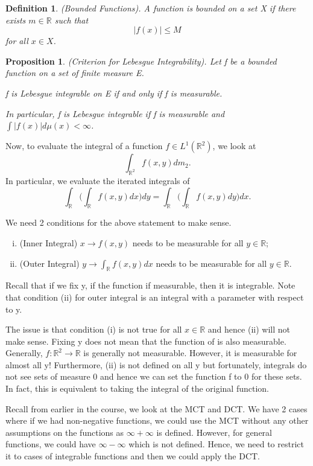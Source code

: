 \documentclass[twoside]{article}
\newtheorem{proposition}[theorem]{Proposition}
\newtheorem{definition}[theorem]{Definition}
\begin{document}
\begin{definition}(Bounded Functions). A function is bounded on a set X if there exists $m \in \mathbb{R}$ such that
$$
|f(x)| \leq M
$$
for all $x \in X$.
\end{definition}


\begin{proposition}(Criterion for Lebesgue Integrability). Let f be a bounded function on a set of finite measure E. 
\begin{center}
  f is Lebesgue integrable on E if and only if f is measurable.
\end{center}

In particular, f is Lebesgue integrable if f is measurable and $\int|f(x)|d\mu(x) < \infty$.
\end{proposition}

\bigskip
Now, to evaluate the integral of a function $f \in L^1(\mathbb{R}^2)$, we look at
$$
\int_{\mathbb{R}^2}f(x,y)dm_2.
$$
In particular, we evaluate the iterated integrals of 
$$
\int_{\mathbb{R}}\big(\int_{\mathbb{R}}f(x,y)dx\big)dy = \int_{\mathbb{R}}\big(\int_{\mathbb{R}}f(x,y)dy\big)dx.
$$

We need 2 conditions for the above statement to make sense. 

\begin{enumerate}[(i)]
  \item (Inner Integral) $x \rightarrow f(x,y)$ needs to be measurable for all $y \in \mathbb{R}$;
  \item (Outer Integral) $y \rightarrow \int_{\mathbb{R}}f(x,y)dx$ needs to be measurable for all $y \in \mathbb{R}$.
\end{enumerate}

Recall that if we fix y, if the function if measurable, then it is integrable. Note that condition (ii) for outer integral is an integral with a parameter with respect to y.

The issue is that condition (i) is not true for all $x \in \mathbb{R}$ and hence (ii) will not make sense. Fixing y does not mean that the function of is also measurable. Generally, $f: \mathbb{R}^2 \rightarrow \mathbb{R}$ is generally not measurable. However, it is measurable for almost all y! Furthermore, (ii) is not defined on all y but fortunately, integrals do not see sets of measure 0 and hence we can set the function f to 0 for these sets. In fact, this is equivalent to taking the integral of the original function.

Recall from earlier in the course, we look at the MCT and DCT. We have 2 cases where if we had non-negative functions, we could use the MCT without any other assumptions on the functions as $\infty + \infty$ is defined. However, for general functions, we could have $\infty - \infty$ which is not defined. Hence, we need to restrict it to cases of integrable functions and then we could apply the DCT. 
\end{document}
